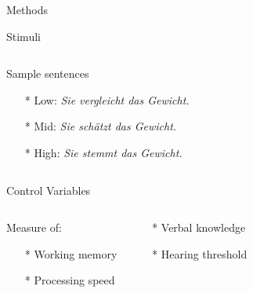 \documentclass[final,12pt]{beamer}
\begin{document}
\begin{frame}[t]
\begin{columns}[t]
\begin{block}{Methods}
\begin{greenbox}{Stimuli}
\begin{columns}
                    \begin{column}{.48\linewidth}
                     \small{ Sample sentences
                        \begin{itemize}
                            \item [\tiny{*}] Low: \textit{Sie vergleicht das Gewicht.}
                            \item [\tiny{*}] Mid: \textit{Sie sch{\"a}tzt das Gewicht.}
                            \item [\tiny{*}] High: \textit{Sie stemmt das Gewicht.}
                        \end{itemize}}                        
                    \end{column}
                \end{columns}            
            \end{greenbox}
        \vspace{0.3em}
            \begin{greenbox}{Control Variables}
                \begin{columns}
                    \begin{column}{.48\linewidth}
                    \small{Measure of:
                        \begin{itemize}
                            \item[\tiny{*}] Working memory
                            \item[\tiny{*}] Processing speed
                        \end{itemize}}
                    \end{column}
              
                    \begin{column}{.48\linewidth}
                        \begin{itemize}
                                \item[\tiny{*}] \small{Verbal knowledge}
                                \item[\tiny{*}] \small{Hearing threshold}
                        \end{itemize}
                    \end{column}
                    
                \end{columns}
            \end{greenbox}
        

\end{block}
\end{columns}
\end{frame}
\end{document}
